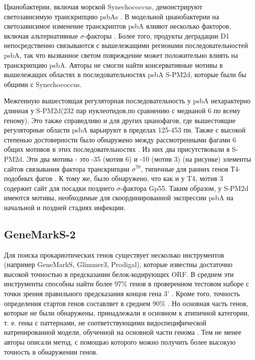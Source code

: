 \documentclass[14pt]{extarticle}
\begin{document}
    \par{Цианобактерии, включая морской Synechococcus, демонстрируют светозависимую транскрипцию psbAs \cite{18_,23_}. В
    модельной цианобактерии на светозависимое изменение транскриптов psbA влияют несколько факторов, включая 
    альтернативные $\sigma$-факторы \cite{24_,25_}. Более того, продукты деградации D1 непосредственно связываются с 
    вышележащими регионами последовательностей psbA, так что вызванное светом повреждение может положительно влиять на 
    транскрипцию psbA. Авторы не смогли найти консервативные мотивы в вышележащих областях в последовательностях psbA 
    S-PM2d, которые были бы общими с Synechococcus.} 
    
    \par{Межгенную вышестоящая регуляторная последовательность у psbA нехарактерно длинная у S-PM2d(232 пар 
    нуклеотидов,по сравнению с медианой 6 по всему геному). Это также справедливо и для других цианофагов, где 
    вышестоящие регуляторные области psbA варьируют в пределах 125-453 пн. Также с высокой степенью достоверности  было 
    обнаружено между рассмотренными фагами 6 общих мотивов в этих последовательностях \cite{puxty-evanx}. Из них два 
    присутствовали в S-PM2d. Эти два мотива - это  -35 (мотив 6) и -10 (мотив 3) (на рисунке) элементы сайтов связывания
    фактора транскрипции $\sigma^{70}$, типичные для ранних генов Т4-подобных фагов \cite{31_}. К тому же, было 
    обнаружено, что как и у T4, мотив 3 содержит сайт для посадки позднего $\sigma$-фактора Gp55. Таким образом, у 
    S-PM2d имеются мотивы, необходимые для скоординированной экспрессии psbA на начальной и поздней стадиях инфекции.}
    
    \begin{center}
        \item \subsection{GeneMarkS-2}
    \end{center}
    
    \par{Для поиска прокариотических генов существует несколько инструментов (например GeneMarkS, Glimmer3, Prodigal), 
    которые известны достаточно высокой точностью в предсказании белок-кодирующих ORF. В среднем эти инструменты 
    способны найти более 97\% генов в проверенном тестовом наборе с точки зрения правильного предсказания концов гена 3'
    \cite{hyatt}. Кроме того, точность определения стартов генов 
    составляет в среднем 90\% \cite{hyatt}. Но основная часть генов, которые не были обнаружены, принадлежали в 
    основном к атипичной категории, т. е. гены с паттернами, не соответствующими видоспецифической натренированной 
    модели, обученной на основной части генома \cite{bordov1}. Тем не менее авторы описали метод, с помощью 
    которого можно получить более высокую точность в обнаружении генов. \cite{lomsad}}
    
\end{document}
